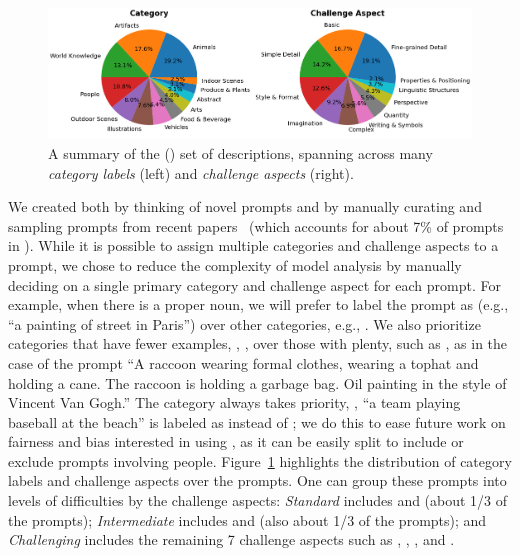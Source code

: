 \begin{figure}[tbh!]
    \centering
    \includegraphics[width=1\textwidth]{figures/bcp.png}
    \caption{A summary of the \bcp{} (\bcpa{}) set of \bcpsize{} descriptions, spanning across many {\it category labels} (left) and {\it challenge aspects} (right).
    }
    \label{figs:bcp}
\end{figure}

We created \bcp{}
both by thinking of novel prompts and by manually curating and sampling prompts from recent papers~\cite{ramesh2021zero, ding2021cogview, vqdiffusion, nichol2021glide, ramesh2022hierarchical} (which accounts for about 7\% of prompts in \bcpa{}). While it is possible to assign multiple categories and challenge aspects to a prompt, we chose to reduce the complexity of model analysis by manually deciding on a single primary category and challenge aspect for each prompt. For example, when there is a proper noun, we will prefer to label the prompt as  (e.g., ``a painting of street in Paris'') over other categories, e.g., . We also prioritize categories that have fewer examples, \eg, , over those with plenty, such as , as in the case of the prompt ``A raccoon wearing formal clothes, wearing a tophat and holding a cane. The raccoon is holding a garbage bag. Oil painting in the style of Vincent Van Gogh.'' The  category always takes priority, \eg, ``a team playing baseball at the beach'' is labeled as  instead of ; we do this to ease future work on fairness and bias interested in using \bcp, as it can be easily split to include or exclude prompts involving people.
Figure~\ref{figs:bcp} highlights the distribution of category labels and challenge aspects over the \bcpsize{} prompts. One can group these prompts into levels of difficulties by the challenge aspects: {\it Standard} includes  and  (about 1/3 of the prompts); {\it Intermediate} includes  and  (also about 1/3 of the prompts); and {\it Challenging} includes the remaining 7 challenge aspects such as , , , and .

